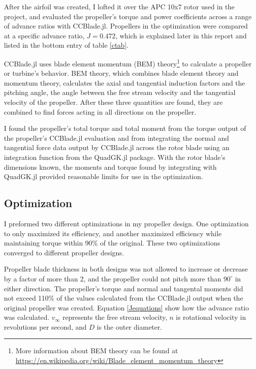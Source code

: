 \documentclass[journal ]{new-aiaa}
\newcounter{ctab}
\begin{document}
After the airfoil was created, I lofted it over the APC 10x7 rotor used in the project, and evaluated the propeller's torque and power coefficients across a range of advance ratios with CCBlade.jl. Propellers in the optimization were compared at a specific advance ratio, $J=0.472$, which is explained later in this report and listed in the bottom entry of table \eqref{ctab}. 

CCBlade.jl uses blade element momentum (BEM) theory\footnote{More information about BEM theory can be found at \url{https://en.wikipedia.org/wiki/Blade_element_momentum_theory}} to calculate a propeller or turbine's behavior. BEM theory, which combines blade element theory and momentum theory, calculates the axial and tangential induction factors and the pitching angle, the angle between the free stream velocity and the tangential velocity of the propeller. After these three quantities are found, they are combined to find forces acting in all directions on the propeller\cite{CCBlade}. 

I found the propeller's total torque and total moment from the torque output of the propeller's CCBlade.jl evaluation and from integrating the normal and tangential force data output by CCBlade.jl across the rotor blade using an integration function from the QuadGK.jl package. With the rotor blade's dimensions known, the moments and torque found by integrating with QuadGK.jl provided reasonable limits for use in the optimization.

\subsection{Optimization}

I preformed two different optimizations in my propeller design. One optimization to only maximized its efficiency, and another maximized efficiency while maintaining torque within 90\% of the original. These two optimizations converged to different propeller designs. 

Propeller blade thickness in both designs was not allowed to increase or decrease by a factor of more than 2, and the propeller could not pitch more than $90^{\circ}$ in either direction. The propeller's torque and normal and tangental moments did not exceed 110\% of the values calculated from the CCBlade.jl output when the original propeller was created. Equation \eqref{Jequations} show how the advance ratio was calculated. $v_{\infty}$ represents the free stream velocity, $n$ is rotational velocity in revolutions per second, and $D$ is the outer diameter.
\end{document}
